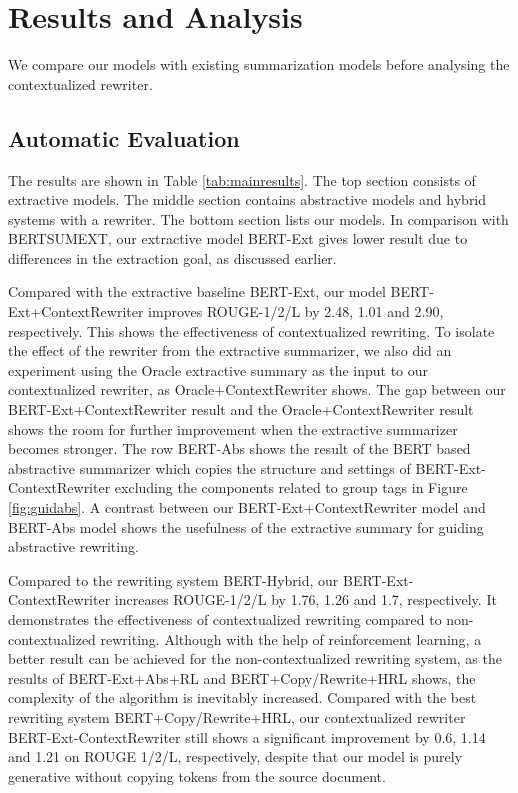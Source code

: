 \documentclass[letterpaper]{article} %
\begin{document}
\section{Results and Analysis}
\label{sec:results}
We compare our models with existing summarization models before analysing the contextualized rewriter. 


\subsection{Automatic Evaluation}
The results are shown in Table \ref{tab:mainresults}. The top section consists of extractive models. The middle section contains abstractive models and hybrid systems with a rewriter. The bottom section lists our models. 
In comparison with BERTSUMEXT, our extractive model BERT-Ext gives lower result due to differences in the extraction goal, as discussed earlier.

Compared with the extractive baseline BERT-Ext, our model BERT-Ext+ContextRewriter improves ROUGE-1/2/L by 2.48, 1.01 and 2.90, respectively. This shows the effectiveness of contextualized rewriting. 
To isolate the effect of the rewriter from the extractive summarizer, we also did an experiment using the Oracle extractive summary as the input to our contextualized rewriter, as Oracle+ContextRewriter shows. The gap between our BERT-Ext+ContextRewriter result and the Oracle+ContextRewriter result shows the room for further improvement when the extractive summarizer becomes stronger.
The row BERT-Abs shows the result of the BERT based abstractive summarizer which copies the structure and settings of BERT-Ext-ContextRewriter excluding the components related to group tags in Figure \ref{fig:guidabs}. A contrast between our BERT-Ext+ContextRewriter model and BERT-Abs model shows the usefulness of the extractive summary for guiding abstractive rewriting. 

Compared to the rewriting system BERT-Hybrid, our BERT-Ext-ContextRewriter increases ROUGE-1/2/L by 1.76, 1.26 and 1.7, respectively. It demonstrates the effectiveness of contextualized rewriting compared to non-contextualized rewriting. Although with the help of reinforcement learning, a better result can be achieved for the non-contextualized rewriting system, as the results of BERT-Ext+Abs+RL and BERT+Copy/Rewrite+HRL shows, the complexity of the algorithm is inevitably increased. Compared with the best rewriting system BERT+Copy/Rewrite+HRL, our contextualized rewriter BERT-Ext-ContextRewriter still shows a significant improvement by 0.6, 1.14 and 1.21 on ROUGE 1/2/L, respectively, despite that our model is purely generative without copying tokens from the source document.
\end{document}
